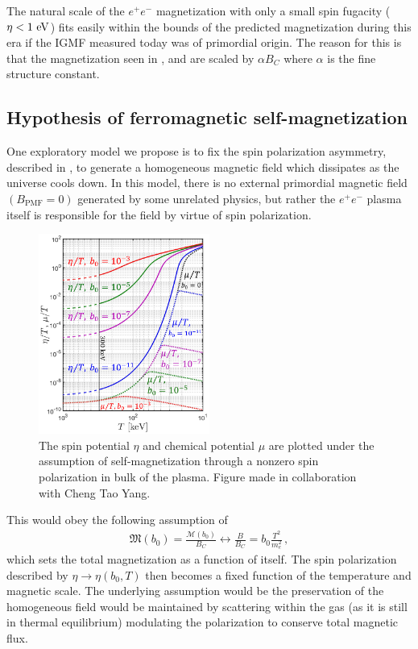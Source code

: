 The natural scale of the $e^{+}e^{-}$ magnetization with only a small spin fugacity ($\eta<1\text{ eV}$) fits easily within the bounds of the predicted magnetization during this era if the IGMF measured today was of primordial origin. The reason for this is that the magnetization seen in ,  and  are scaled by $\alpha{B}_{C}$ where $\alpha$ is the fine structure constant.

\subsection{Hypothesis of ferromagnetic self-magnetization}
\label{sec:self}
\noindent One exploratory model we propose is to fix the spin polarization asymmetry, described in , to generate a homogeneous magnetic field which dissipates as the universe cools down. In this model, there is no external primordial magnetic field $({B}_\mathrm{PMF}=0)$ generated by some unrelated physics, but rather the $e^{+}e^{-}$ plasma itself is responsible for the field by virtue of spin polarization.

\begin{figure}[ht]
 \centering
 \includegraphics[width=0.5\textwidth]{plots/chap04cosmo/Spinchemical_03.png}
 \caption{The spin potential $\eta$ and chemical potential $\mu$ are plotted under the assumption of self-magnetization through a nonzero spin polarization in bulk of the plasma. Figure made in collaboration with Cheng Tao Yang.}
 \label{fig:self} 
\end{figure}

This would obey the following assumption of
\begin{align}
 \label{selfmag}
 {\mathfrak M}(b_{0})=\frac{\mathcal{M}(b_0)}{{B}_{C}}\longleftrightarrow\frac{B}{{B}_{C}}=b_{0}\frac{T^{2}}{m_{e}^{2}}\,,
\end{align}
which sets the total magnetization as a function of itself. The spin polarization described by $\eta\rightarrow\eta(b_{0},T)$ then becomes a fixed function of the temperature and magnetic scale. The underlying assumption would be the preservation of the homogeneous field would be maintained by scattering within the gas (as it is still in thermal equilibrium) modulating the polarization to conserve total magnetic flux.

